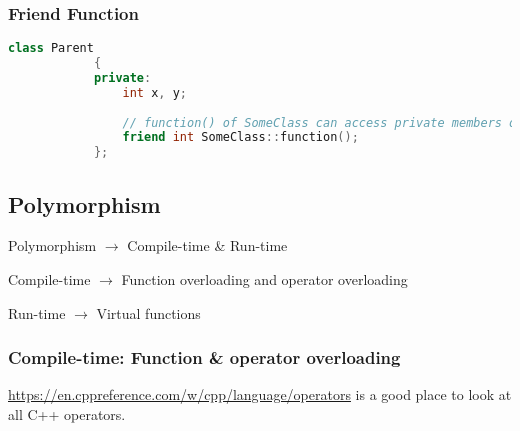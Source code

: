 \documentclass{article}
\begin{document}
        \subsubsection{Friend Function}
        \begin{lstlisting}[language=C++, caption=Friend Function]
            class Parent
            {
            private:
                int x, y;
                
                // function() of SomeClass can access private members of Parent.
                friend int SomeClass::function();
            };
        \end{lstlisting}
        
        
    \subsection{Polymorphism}
    Polymorphism $\rightarrow$  Compile-time \& Run-time
    
    Compile-time $\rightarrow$ Function overloading and operator overloading
    
    Run-time $\rightarrow$ Virtual functions
    
        \subsubsection{Compile-time: Function \& operator overloading}
        \url{https://en.cppreference.com/w/cpp/language/operators} is a good place to look at all C++ operators. 
        
\end{document}
